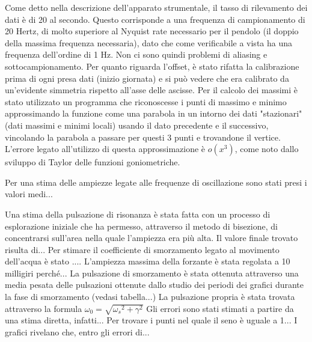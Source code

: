 Come detto nella descrizione dell'apparato strumentale, il tasso di rilevamento dei dati è di 20 al secondo. Questo corrisponde a una
frequenza di campionamento di 20 Hertz, di molto superiore al 
Nyquist rate necessario per il pendolo (il doppio della massima frequenza
necessaria), dato che come verificabile a vista ha una frequenza dell'ordine di 1 Hz. 
Non ci sono quindi problemi di aliasing e sottocampionamento.
Per quanto riguarda l'offset, è stato rifatta la calibrazione prima di ogni presa dati (inizio giornata) e si può vedere che era
 calibrato da un'evidente simmetria rispetto all'asse delle ascisse.
Per il calcolo dei massimi è stato utilizzato un programma che riconoscesse i punti di massimo e minimo approssimando
la funzione come una parabola in un intorno dei dati "stazionari" (dati massimi e minimi locali) usando il dato precedente e il successivo,
vincolando la parabola a passare per questi 3 punti e trovandone il vertice. L'errore legato all'utilizzo
 di questa approssimazione è $o(x^3)$, come noto dallo sviluppo di Taylor delle funzioni goniometriche.

Per una stima delle ampiezze legate alle frequenze di oscillazione sono stati presi i valori medi...

Una stima della pulsazione di risonanza è stata fatta con un processo di esplorazione iniziale che ha permesso, attraverso
il metodo di bisezione, di concentrarsi sull'area nella quale l'ampiezza era più alta. Il valore finale trovato risulta di...
Per stimare il coefficiente di smorzamento legato al movimento dell'acqua è stato ....
L'ampiezza massima della forzante è stata regolata a 10 milligiri perché...
La pulsazione di smorzamento è stata ottenuta attraverso una media pesata delle pulsazioni ottenute dallo studio dei periodi dei
grafici durante la fase di smorzamento (vedasi tabella...)
La pulsazione propria è stata trovata attraverso la formula $\omega_0 =\sqrt{{\omega_s} ^ 2 + \gamma ^ 2 }$
Gli errori sono stati stimati a partire da una stima diretta, infatti...
Per trovare i punti nel quale il seno è uguale a 1...
I grafici rivelano che, entro gli errori di...

